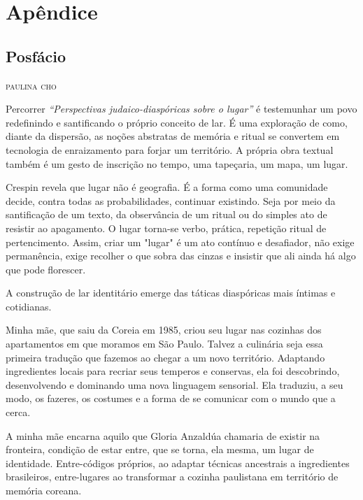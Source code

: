 \part{Apêndice}

\chapter*{Posfácio\smallskip{}}

\begin{flushright}
\textsc{paulina cho}
\end{flushright}

\noindent{}Percorrer \emph{``Perspectivas judaico-diaspóricas sobre o lugar''} é
testemunhar um povo redefinindo e santificando o próprio conceito de
lar. É uma exploração de como, diante da dispersão, as noções abstratas
de memória e ritual se convertem em tecnologia de enraizamento para
forjar um território. A própria obra textual também é um gesto de
inscrição no tempo, uma tapeçaria, um mapa, um lugar.

Crespin revela que lugar não é geografia. É a forma como uma comunidade
decide, contra todas as probabilidades, continuar existindo. Seja por
meio da santificação de um texto, da observância de um ritual ou do
simples ato de resistir ao apagamento. O lugar torna-se verbo, prática,
repetição ritual de pertencimento. Assim, criar um "lugar" é um ato
contínuo e desafiador, não exige permanência, exige recolher o que sobra
das cinzas e insistir que ali ainda há algo que pode florescer.

A construção de lar identitário emerge das táticas diaspóricas mais
íntimas e cotidianas.

Minha mãe, que saiu da Coreia em 1985, criou seu lugar nas cozinhas dos
apartamentos em que moramos em São Paulo. Talvez a culinária seja essa
primeira tradução que fazemos ao chegar a um novo território. Adaptando
ingredientes locais para recriar seus temperos e conservas, ela foi
descobrindo, desenvolvendo e dominando uma nova linguagem sensorial. Ela
traduziu, a seu modo, os fazeres, os costumes e a forma de se comunicar
com o mundo que a cerca.

A minha mãe encarna aquilo que Gloria Anzaldúa chamaria de existir na
fronteira, condição de estar entre, que se torna, ela mesma, um lugar de
identidade. Entre-códigos próprios, ao adaptar técnicas ancestrais a
ingredientes brasileiros, entre-lugares ao transformar a cozinha
paulistana em território de memória coreana.


